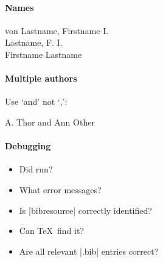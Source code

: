 \paragraph{Names}
\begin{pseudoverb}
von Lastname, Firstname I. \\
Lastname, F. I. \\
Firstname Lastname
\end{pseudoverb}

\paragraph{Multiple authors} Use `and' not `,':
\begin{pseudoverb}
A. Thor and Ann Other
\end{pseudoverb}

\paragraph{Debugging}
\begin{itemize}
\item Did  run?
\item What error messages?
\item Is |bibresource| correctly identified?
\item Can \TeX\ find it?
\item Are all relevant |.bib| entries correct?
\end{itemize}

